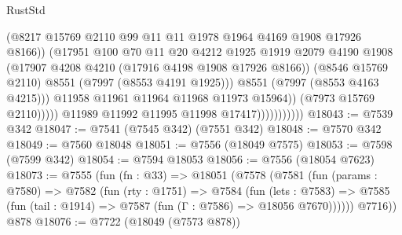 \begin{lexlean}{RustStd}
\begin{coremodule}
                                          (@8217
                                            @15769
                                            @2110
                                            @99
                                            @11
                                            @11
                                            @1978
                                            @1964
                                            @4169
                                            @1908
                                            @17926
                                            @8166))
                                        (@17951
                                          @100
                                          @70
                                          @11
                                          @20
                                          @4212
                                          @1925
                                          @1919
                                          @2079
                                          @4190
                                          @1908
                                          (@17907 @4208 @4210 (@17916 @4198 @1908 @17926 @8166))
                                          (@8546 @15769 @2110)
                                          @8551
                                          (@7997 (@8553 @4191 @1925)))
                                        @8551
                                        (@7997 (@8553 @4163 @4215)))
                                      @11958
                                      @11961
                                      @11964
                                      @11968
                                      @11973
                                      @15964))
                                  (@7973 @15769 @2110)))))
                          @11989
                          @11992
                          @11995
                          @11998
                          @17417)))))))))))
@18043 := @7539 @342
@18047 := @7541 (@7545 @342) (@7551 @342)
@18048 := @7570 @342
@18049 := @7560 @18048
@18051 := @7556 (@18049 @7575)
@18053 := @7598 (@7599 @342)
@18054 := @7594 @18053
@18056 := @7556 (@18054 @7623)
@18073 := @7555
    (fun (fn : @33) =>
    @18051
      (@7578
        (@7581
          (fun (params : @7580) =>
          @7582
            (fun (rty : @1751) =>
            @7584
              (fun (lets : @7583) =>
              @7585 (fun (tail : @1914) => @7587 (fun (Γ : @7586) => @18056 @7670))))))
        @7716))
    @878
@18076 := @7722 (@18049 (@7573 @878))

\end{coremodule}
\end{lexlean}
